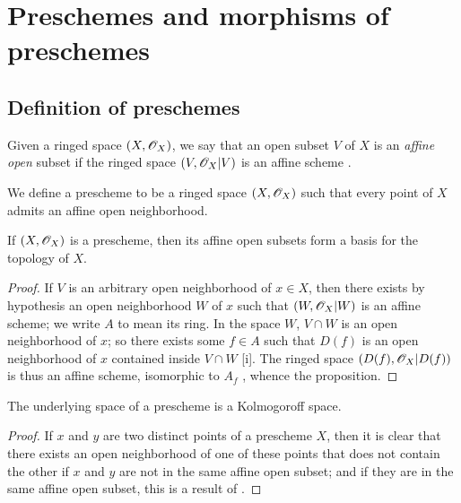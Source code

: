 \section{Preschemes and morphisms of preschemes}
\label{section-preschemes-and-morphisms}

\subsection{Definition of preschemes}
\label{subsection-preschemes-definition}

\begin{env}[2.1.1]
\label{1.2.1.1}
Given a ringed space $(X,\mathscr{O}_X)$, we say that an open subset $V$ of $X$ is an \emph{affine open} subset if the ringed space $(V,\mathscr{O}_X|V)$ is an affine scheme .
\end{env}

\begin{defn}[2.1.2]
\label{1.2.1.2}
We define a prescheme to be a ringed space $(X,\mathscr{O}_X)$ such that every point of $X$ admits an affine open neighborhood.
\end{defn}

\begin{prop}[2.1.3]
\label{1.2.1.3}
If $(X,\mathscr{O}_X)$ is a prescheme, then its affine open subsets form a basis for the topology of $X$.
\end{prop}

\begin{proof}
\label{proof-1.2.1.3}
If $V$ is an arbitrary open neighborhood of $x\in X$, then there exists by hypothesis an open neighborhood $W$ of $x$ such that $(W,\mathscr{O}_X|W)$ is an affine scheme;
we write $A$ to mean its ring.
In the space $W$, $V\cap W$ is an open neighborhood of $x$;
so there exists some $f\in A$ such that $D(f)$ is an open neighborhood of $x$ contained inside $V\cap W$ [i].
The ringed space $(D(f),\mathscr{O}_X|D(f))$ is thus an affine scheme, isomorphic to $A_f$ , whence the proposition.
\end{proof}

\begin{prop}[2.1.4]
\label{1.2.1.4}
The underlying space of a prescheme is a Kolmogoroff space.
\end{prop}

\begin{proof}
\label{proof-1.2.1.4}
If $x$ and $y$ are two distinct points of a prescheme $X$, then it is clear that there exists an open neighborhood of one of these points that does not contain the other if $x$ and $y$ are not in the same affine open subset; and if they are in the same affine open subset, this is a result of .
\end{proof}

